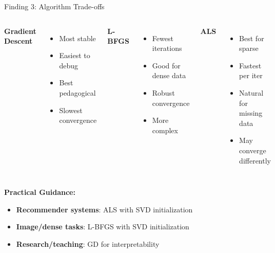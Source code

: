 \documentclass[aspectratio=169,usenames,dvipsnames]{beamer}
\begin{document}
\begin{frame}{Finding 3: Algorithm Trade-offs}
    
    \begin{columns}[T]
    
    \textbf{\textcolor{emoryblue}{Gradient Descent}}
    \begin{itemize}
        \item [\checkmark] Most stable
        \item [\checkmark] Easiest to debug
        \item [\checkmark] Best pedagogical
        \item [\times] Slowest convergence
    \end{itemize}
    
    
    \textbf{\textcolor{emoryblue}{L-BFGS}}
    \begin{itemize}
        \item [\checkmark] Fewest iterations
        \item [\checkmark] Good for dense data
        \item [\checkmark] Robust convergence
        \item [\times] More complex
    \end{itemize}
    
    
    \textbf{\textcolor{emoryblue}{ALS}}
    \begin{itemize}
        \item [\checkmark] Best for sparse
        \item [\checkmark] Fastest per iter
        \item [\checkmark] Natural for missing data
        \item [\times] May converge differently
    \end{itemize}
    \end{columns}
    
    \vspace{0.4cm}
    
    \textbf{Practical Guidance:}
    \begin{itemize}
        \item \textcolor{emoryblue}{\textbf{Recommender systems}}: ALS with SVD initialization
        \item \textcolor{emoryblue}{\textbf{Image/dense tasks}}: L-BFGS with SVD initialization
        \item \textcolor{emoryblue}{\textbf{Research/teaching}}: GD for interpretability
    \end{itemize}
\end{frame}
\end{document}
